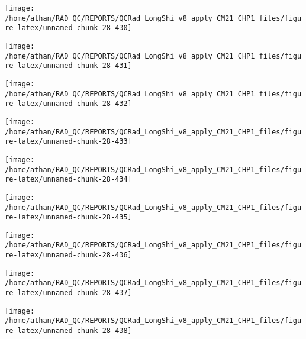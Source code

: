 \documentclass[
  10pt,
  a4paper,oneside]{article}
\begin{document}
\begin{center}\texttt{[image: /home/athan/RAD\_QC/REPORTS/QCRad\_LongShi\_v8\_apply\_CM21\_CHP1\_files/figure-latex/unnamed-chunk-28-430]} \end{center}

\begin{center}\texttt{[image: /home/athan/RAD\_QC/REPORTS/QCRad\_LongShi\_v8\_apply\_CM21\_CHP1\_files/figure-latex/unnamed-chunk-28-431]} \end{center}

\begin{center}\texttt{[image: /home/athan/RAD\_QC/REPORTS/QCRad\_LongShi\_v8\_apply\_CM21\_CHP1\_files/figure-latex/unnamed-chunk-28-432]} \end{center}

\begin{center}\texttt{[image: /home/athan/RAD\_QC/REPORTS/QCRad\_LongShi\_v8\_apply\_CM21\_CHP1\_files/figure-latex/unnamed-chunk-28-433]} \end{center}

\begin{center}\texttt{[image: /home/athan/RAD\_QC/REPORTS/QCRad\_LongShi\_v8\_apply\_CM21\_CHP1\_files/figure-latex/unnamed-chunk-28-434]} \end{center}

\begin{center}\texttt{[image: /home/athan/RAD\_QC/REPORTS/QCRad\_LongShi\_v8\_apply\_CM21\_CHP1\_files/figure-latex/unnamed-chunk-28-435]} \end{center}

\begin{center}\texttt{[image: /home/athan/RAD\_QC/REPORTS/QCRad\_LongShi\_v8\_apply\_CM21\_CHP1\_files/figure-latex/unnamed-chunk-28-436]} \end{center}

\begin{center}\texttt{[image: /home/athan/RAD\_QC/REPORTS/QCRad\_LongShi\_v8\_apply\_CM21\_CHP1\_files/figure-latex/unnamed-chunk-28-437]} \end{center}

\begin{center}\texttt{[image: /home/athan/RAD\_QC/REPORTS/QCRad\_LongShi\_v8\_apply\_CM21\_CHP1\_files/figure-latex/unnamed-chunk-28-438]} \end{center}
\end{document}
